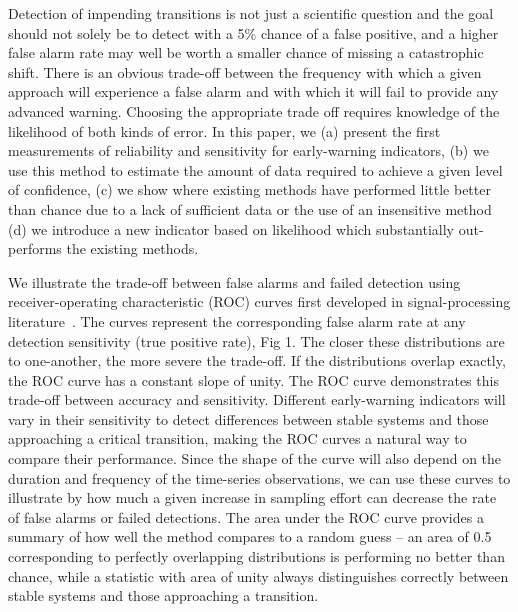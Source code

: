 \documentclass{pnastwo}
\begin{document}
\begin{article}
Detection of impending transitions is not just a scientific question and the goal should not solely be to detect with a 5\% chance of a false positive,
and a higher false alarm rate may well be  worth a smaller chance of  missing a catastrophic shift. 
There is an obvious trade-off between the frequency with which a given approach will experience a false alarm and
with which it will fail to provide any advanced warning. 
Choosing the appropriate trade off requires knowledge of the likelihood of both kinds of error.
In this paper, we
(a) present the first measurements of reliability and sensitivity for early-warning indicators, 
(b) we use this method to estimate the amount of data required to achieve a given level of confidence,  
(c) we show where existing methods have performed little better than chance due to a lack of sufficient data or the use of an insensitive method 
(d) we introduce a new indicator based on likelihood which substantially out-performs the existing methods.     

We illustrate the trade-off between false alarms and failed detection using receiver-operating characteristic (ROC) curves first developed in signal-processing literature~\cite{Green1989, Keller2009}⁠. 
The curves represent the corresponding false alarm rate at any detection sensitivity (true positive rate), Fig 1.
The closer these distributions are to one-another, the more severe the trade-off.  
If the distributions overlap exactly, the ROC curve has a constant slope of unity.  
The ROC curve demonstrates this trade-off between accuracy and sensitivity.  
Different early-warning indicators will vary in their sensitivity to detect differences between stable systems and those approaching a critical transition, making the ROC curves a natural way to compare their performance.  
Since the shape of the curve will also depend on the duration and frequency of the time-series observations,
we can use these curves to illustrate by how much a given increase in sampling effort can decrease the rate of false alarms or failed detections.  
The area under the ROC curve provides a summary of how well the method compares to a random guess --
an area of 0.5 corresponding to perfectly overlapping distributions is performing no better than chance, while a statistic with area of unity always distinguishes correctly between stable systems and those approaching a transition. 


\end{article}
\end{document}
